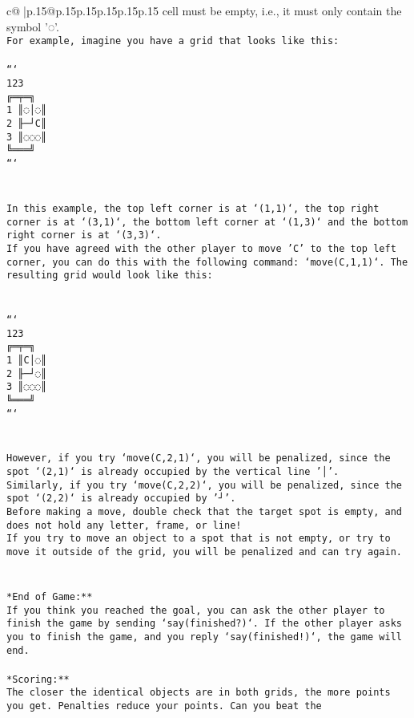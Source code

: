 \documentclass{article}
\begin{document}
{\begin{supertabular}{c@{$\;$}|p{.15\linewidth}@{}p{.15\linewidth}p{.15\linewidth}p{.15\linewidth}p{.15\linewidth}p{.15\linewidth}}
{{{cell must be empty, i.e., it must only contain the symbol '◌'.\\ \tt * For example, imagine you have a grid that looks like this: \\ \tt \\ \tt ```\\ \tt     123\\ \tt    ╔═╤═╗\\ \tt  1 ║◌│◌║\\ \tt  2 ╟─┘C║\\ \tt  3 ║◌◌◌║\\ \tt    ╚═══╝\\ \tt ```\\ \tt \\ \tt \\ \tt * In this example, the top left corner is at `(1,1)`, the top right corner is at `(3,1)`, the bottom left corner at `(1,3)` and the bottom right corner is at `(3,3)`.\\ \tt * If you have agreed with the other player to move 'C' to the top left corner, you can do this with the following command: `move(C,1,1)`. The resulting grid would look like this: \\ \tt \\ \tt \\ \tt ```\\ \tt     123\\ \tt    ╔═╤═╗\\ \tt  1 ║C│◌║\\ \tt  2 ╟─┘◌║\\ \tt  3 ║◌◌◌║\\ \tt    ╚═══╝\\ \tt ```\\ \tt \\ \tt \\ \tt * However, if you try `move(C,2,1)`, you will be penalized, since the spot `(2,1)` is already occupied by the vertical line '│'.\\ \tt * Similarly, if you try `move(C,2,2)`, you will be penalized, since the spot `(2,2)` is already occupied by '┘'.\\ \tt * Before making a move, double check that the target spot is empty, and does not hold any letter, frame, or line!\\ \tt * If you try to move an object to a spot that is not empty, or try to move it outside of the grid, you will be penalized and can try again.\\ \tt \\ \tt \\ \tt **End of Game:**\\ \tt If you think you reached the goal, you can ask the other player to finish the game by sending `say(finished?)`. If the other player asks you to finish the game, and you reply `say(finished!)`, the game will end.\\ \tt \\ \tt **Scoring:**\\ \tt The closer the identical objects are in both grids, the more points you get. Penalties reduce your points. Can you beat the }}}
\end{supertabular}}
\end{document}
